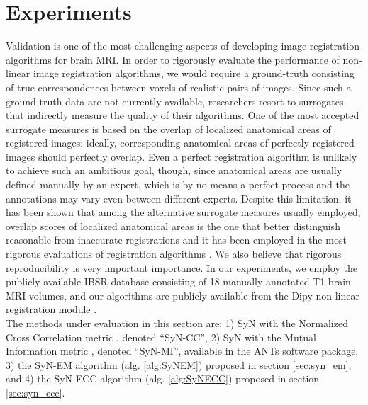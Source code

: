 \section{Experiments}
Validation is one of the most challenging aspects of developing image registration algorithms for brain MRI. In order to rigorously evaluate the performance of non-linear
image registration algorithms, we would require a ground-truth consisting of true correspondences between voxels of realistic pairs of images. Since such a ground-truth data are not currently available, researchers resort to surrogates that indirectly measure the quality of their algorithms. One of the most accepted surrogate measures is based
on the overlap of localized anatomical areas of registered images: ideally, corresponding anatomical areas of perfectly registered images should perfectly
overlap. Even a perfect registration algorithm is unlikely to achieve such an ambitious goal, though, since anatomical areas are usually defined manually by an expert, which is
by no means a perfect process and the annotations may vary even between different experts. Despite this limitation, it has been shown that among the alternative surrogate measures
usually employed, overlap scores of localized anatomical areas is the one that better distinguish reasonable from inaccurate registrations \cite{Rohlfing2012} and it has been employed
in the most rigorous evaluations of registration algorithms \cite{Klein2009}\cite{Klein2010}\cite{Rohlfing2012}. We also believe that rigorous reproducibility is very important importance. In our
experiments, we employ the publicly available IBSR database consisting of 18 manually annotated T1 brain MRI volumes, and our algorithms are publicly available from the Dipy
non-linear registration module \cite{Garyfallidis2014}.\\

The methods under evaluation in this section are: 1) SyN with the Normalized Cross Correlation metric \cite{Avants2008}, denoted ``SyN-CC'', 2) SyN with the Mutual Information metric \cite{Mattes2003}, denoted ``SyN-MI'', available in the ANTs software package, 3) the SyN-EM algorithm (alg. \ref{alg:SyNEM}) proposed in section \ref{sec:syn_em}, and
4) the SyN-ECC algorithm (alg. \ref{alg:SyNECC}) proposed in section \ref{sec:syn_ecc}.

